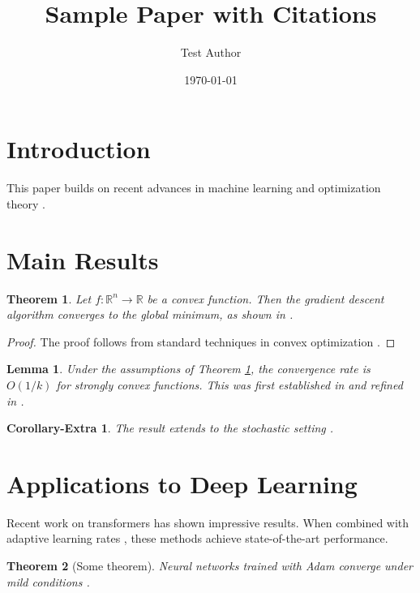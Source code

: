 \documentclass{article}
\title{Sample Paper with Citations}
\author{Test Author}
\date{\today}
\newtheorem{theorem}{Theorem}
\newtheorem{lemma}{Lemma}
\newtheorem{cor}{Corollary-Extra}
\begin{document}
\maketitle

\section{Introduction}

This paper builds on recent advances in machine learning \cite{vaswani2017attention} and optimization theory \cite{kingma2014adam}.

\section{Main Results}

\begin{theorem}\label{thm:main}
Let $f: \mathbb{R}^n \to \mathbb{R}$ be a convex function. Then the gradient descent algorithm converges to the global minimum, as shown in \cite{nesterov2003introductory}.
\end{theorem}

\begin{proof}
The proof follows from standard techniques in convex optimization \cite{boyd2004convex}.
\end{proof}

\begin{lemma}\label{lem:auxiliary}
Under the assumptions of Theorem \ref{thm:main}, the convergence rate is $O(1/k)$ for strongly convex functions. This was first established in \cite{nesterov2003introductory} and refined in \cite{polyak1964some}.
\end{lemma}

\begin{cor}\label{cor:stuff}
The result extends to the stochastic setting \cite{kingma2014adam, robbins1951stochastic}.
\end{cor}

\section{Applications to Deep Learning}

Recent work on transformers \cite{vaswani2017attention} has shown impressive results. When combined with adaptive learning rates \cite{kingma2014adam}, these methods achieve state-of-the-art performance.

\begin{theorem}[Some theorem]\label{thm:convergence}
Neural networks trained with Adam converge under mild conditions \cite{kingma2014adam}.
\end{theorem}
\end{document}
